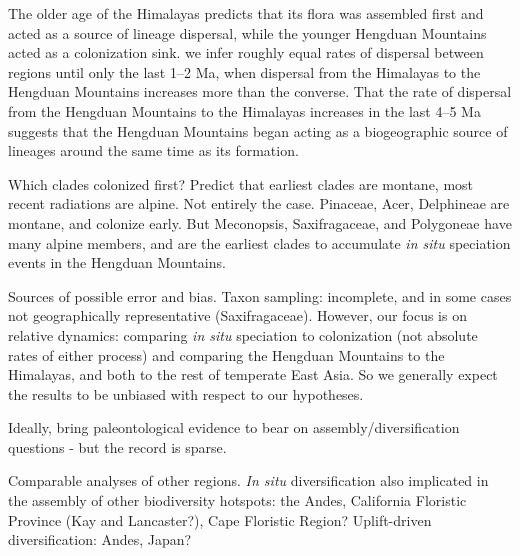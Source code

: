 The older age of the Himalayas predicts that its flora was assembled first and acted as a source of lineage dispersal, while the younger Hengduan Mountains acted as a colonization sink. %
we infer roughly equal rates of dispersal between regions until only the last 1--2 Ma, when dispersal from the Himalayas to the Hengduan Mountains increases more than the converse. That the rate of dispersal from the Hengduan Mountains to the Himalayas increases in the last 4--5 Ma suggests that the Hengduan Mountains began acting as a biogeographic source of lineages around the same time as its formation.

Which clades colonized first? Predict that earliest clades are montane, most recent radiations are alpine. Not entirely the case. Pinaceae, Acer, Delphineae are montane, and colonize early. But Meconopsis, Saxifragaceae, and Polygoneae have many alpine members, and are the earliest clades to accumulate \textit{in situ} speciation events in the Hengduan Mountains.%

Sources of possible error and bias. Taxon sampling: incomplete, and in some cases not geographically representative (Saxifragaceae). However, our focus is on relative dynamics: comparing \textit{in situ} speciation to colonization (not absolute rates of either process) and comparing the Hengduan Mountains to the Himalayas, and both to the rest of temperate East Asia. So we generally expect the results to be unbiased with respect to our hypotheses.

Ideally, bring paleontological evidence to bear on assembly/diversification questions - but the record is sparse.

Comparable analyses of other regions. \textit{In situ} diversification also implicated in the assembly of other biodiversity hotspots: the Andes, California Floristic Province (Kay and Lancaster?), Cape Floristic Region? Uplift-driven diversification: Andes, Japan?
